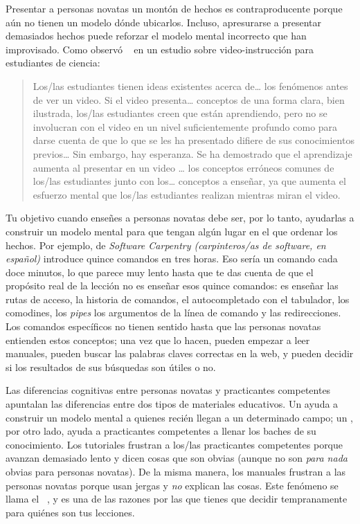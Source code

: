 Presentar a personas novatas un montón de hechos es contraproducente
porque aún no tienen un modelo dónde ubicarlos.
Incluso,
apresurarse a presentar demasiados hechos puede reforzar
el modelo mental incorrecto que han improvisado.
Como observó ~\cite{Mull2007a} en un estudio sobre video-instrucción para estudiantes de ciencia:

\begin{quote}
Los/las estudiantes tienen ideas existentes acerca de{\ldots} los fenómenos antes de ver un video. Si el video presenta{\ldots} conceptos de una forma clara, bien ilustrada, los/las estudiantes creen que están aprendiendo, pero no se involucran con el video en un nivel suficientemente profundo como para darse cuenta de que lo que se les ha presentado difiere de sus conocimientos previos{\ldots} Sin embargo, hay esperanza. Se ha demostrado que el aprendizaje aumenta al presentar en un video {\ldots} los conceptos erróneos comunes de los/las estudiantes junto con los{\ldots} conceptos a enseñar, ya que aumenta el esfuerzo mental que los/las estudiantes realizan mientras miran el video. 
\end{quote}

Tu objetivo cuando enseñes a personas novatas debe ser, por lo tanto,
ayudarlas a construir un modelo mental
para que tengan algún lugar en el que ordenar los hechos.
Por ejemplo,
 de \emph{Software Carpentry (carpinteros/as de software, en español)}
introduce quince comandos en tres horas.
Eso sería un comando cada doce minutos,
lo que parece muy lento hasta que te das cuenta de que
el propósito real de la lección no es enseñar esos quince comandos:
es enseñar las rutas de acceso,
la historia de comandos,
el autocompletado con el tabulador,
los comodines,
los \emph{pipes}
los argumentos de la línea de comando
y las redirecciones.
Los comandos específicos no tienen sentido hasta que las personas novatas entienden estos conceptos;
una vez que lo hacen,
pueden empezar a leer manuales,
pueden buscar las palabras claves correctas en la web,
y pueden decidir si los resultados de sus búsquedas son útiles o no.

Las diferencias cognitivas entre personas novatas y practicantes competentes
apuntalan las diferencias entre dos tipos de materiales educativos.
Un  ayuda a construir un modelo mental a quienes recién llegan a un determinado campo;
un ,
por otro lado,
ayuda a practicantes competentes a llenar los baches de su conocimiento.
Los tutoriales frustran a los/las practicantes competentes porque avanzan demasiado lento
y dicen cosas que son obvias
(aunque no son \emph{para nada} obvias para personas novatas).
De la misma manera,
los manuales frustran a las personas novatas porque usan jergas y \emph{no} explican las cosas.
Este fenómeno se llama el  ~\cite{Kaly2003},
y es una de las razones por las que tienes que decidir tempranamente para quiénes son tus lecciones. 

